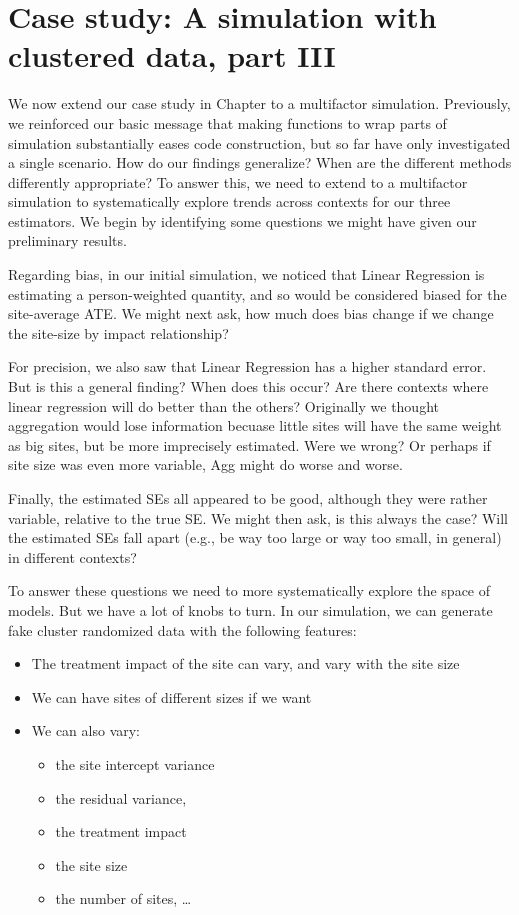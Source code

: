 \documentclass[
]{book}
\providecommand{\tightlist}{%
  \setlength{\itemsep}{0pt}\setlength{\parskip}{0pt}}
\begin{document}
\hypertarget{case-study-a-simulation-with-clustered-data-part-iii}{%
\chapter{Case study: A simulation with clustered data, part III}\label{case-study-a-simulation-with-clustered-data-part-iii}}

We now extend our case study in Chapter \citet{case_cluster} to a multifactor simulation.
Previously, we reinforced our basic message that making functions to wrap parts of simulation substantially eases code construction, but so far have only investigated a single scenario.
How do our findings generalize? When are the different methods differently appropriate?
To answer this, we need to extend to a multifactor simulation to systematically explore trends across contexts for our three estimators.
We begin by identifying some questions we might have given our preliminary results.

Regarding bias, in our initial simulation, we noticed that Linear Regression is estimating a person-weighted quantity, and so would be considered biased for the site-average ATE.
We might next ask, how much does bias change if we change the site-size by impact relationship?

For precision, we also saw that Linear Regression has a higher standard error.
But is this a general finding? When does this occur?
Are there contexts where linear regression will do better than the others?
Originally we thought aggregation would lose information becuase little sites will have the same weight as big sites, but be more imprecisely estimated.
Were we wrong? Or perhaps if site size was even more variable, Agg might do worse and worse.

Finally, the estimated SEs all appeared to be good, although they were rather variable, relative to the true SE.
We might then ask, is this always the case? Will the estimated SEs fall apart (e.g., be way too large or way too small, in general) in different contexts?

To answer these questions we need to more systematically explore the space of models. But we have a lot of knobs to turn.
In our simulation, we can generate fake cluster randomized data with the following features:

\begin{itemize}
\item
  The treatment impact of the site can vary, and vary with the site size
\item
  We can have sites of different sizes if we want
\item
  We can also vary:

  \begin{itemize}
  \tightlist
  \item
    the site intercept variance
  \item
    the residual variance,
  \item
    the treatment impact
  \item
    the site size
  \item
    the number of sites, \ldots{}
  \end{itemize}
\end{itemize}
\end{document}
